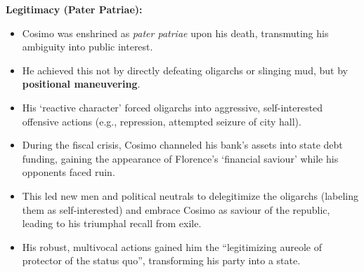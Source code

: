 \documentclass{article}
\begin{document}
    \noindent \textbf{Legitimacy (Pater Patriae):}
    \begin{itemize}
        \item Cosimo was enshrined as \textit{pater patriae} upon his death,
        transmuting his ambiguity into public interest.
        \item He achieved this not by directly defeating oligarchs or
        slinging mud, but by \textbf{positional maneuvering}.
        \item His `reactive character' forced oligarchs into aggressive,
        self-interested offensive actions (e.g., repression, attempted
        seizure of city hall).
        \item During the fiscal crisis, Cosimo channeled his bank's assets
        into state debt funding, gaining the appearance of Florence's
        `financial saviour' while his opponents faced ruin.
        \item This led new men and political neutrals to delegitimize the
        oligarchs (labeling them as self-interested) and embrace Cosimo as
        saviour of the republic, leading to his triumphal recall from exile.
        \item His robust, multivocal actions gained him the ``legitimizing
        aureole of protector of the status quo'', transforming his party
        into a state.
    \end{itemize}
\end{document}
